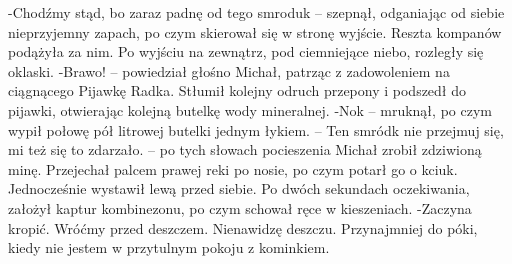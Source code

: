 \documentclass[../MAIN.tex]{subfiles}
\begin{document}
-Chodźmy stąd, bo zaraz padnę od tego smrodu\3k -- szepnął, odganiając od siebie nieprzyjemny zapach, po czym skierował się w stronę wyjście. Reszta kompanów podążyła za nim. Po wyjściu na zewnątrz, pod ciemniejące niebo, rozległy się oklaski.
-Brawo! -- powiedział głośno Michał, patrząc z zadowoleniem na ciągnącego Pijawkę Radka. Stłumił kolejny odruch przepony i podszedł do pijawki, otwierając kolejną butelkę wody mineralnej.
-No\3k -- mruknął, po czym wypił połowę pół litrowej butelki jednym łykiem. -- Ten smród\3k nie przejmuj się, mi też się to zdarzało. -- po tych słowach pocieszenia Michał zrobił zdziwioną minę. Przejechał palcem prawej reki po nosie, po czym potarł go o kciuk. Jednocześnie wystawił lewą przed siebie. Po dwóch sekundach oczekiwania, założył kaptur kombinezonu, po czym schował ręce w kieszeniach.
-Zaczyna kropić. Wróćmy przed deszczem. Nienawidzę deszczu. Przynajmniej do póki, kiedy nie jestem w przytulnym pokoju z kominkiem.
\end{document}
